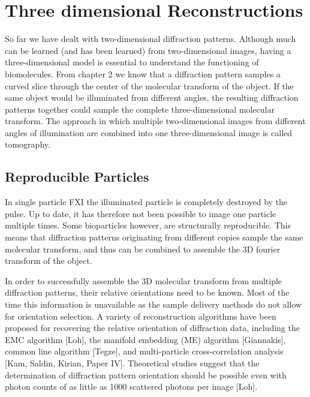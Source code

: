 \chapter{Three dimensional Reconstructions}
So far we have dealt with two-dimensional diffraction patterns. Although much can be learned (and has been learned) from two-dimensional images, having a three-dimensional model is essential to understand the functioning of biomolecules. From chapter 2 we know that a diffraction pattern samples a curved slice through the center of the molecular transform of the object. If the same object would be illuminated from different angles, the resulting diffraction patterns together could sample the complete three-dimensional molecular transform. The approach in which multiple two-dimensional images from different angles of illumination are combined into one three-dimensional image is called tomography.%

\section{Reproducible Particles}

In single particle FXI the illuminated particle is completely destroyed by the pulse. Up to date, it has therefore not been possible to image one particle multiple times. Some bioparticles however, are structurally reproducible. This means that diffraction patterns originating from different copies sample the same molecular transform, and thus can be combined to assemble the 3D fourier transform of the object. 

In order to successfully assemble the 3D molecular transform from multiple diffraction patterns, their relative orientations need to be known. Most of the time this information is unavailable as the sample delivery methods do not allow for orientation selection. A variety of reconstruction algorithms have been proposed for recovering the relative orientation of diffraction data, including the EMC algorithm [Loh], the manifold embedding (ME) algorithm [Giannakis], common line algorithm [Tegze], and multi-particle cross-correlation analysis [Kam, Saldin, Kirian, Paper IV]. Theoretical studies suggest that the determination of diffraction pattern orientation should be possible even with photon counts of as little as 1000 scattered photons per image [Loh].

